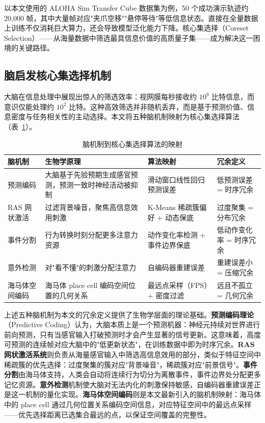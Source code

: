 \documentclass[12pt,a4paper]{article}
\begin{document}
以本文使用的 ALOHA Sim Transfer Cube 数据集为例，50 个成功演示轨迹约 20,000 帧，其中大量帧对应"夹爪空移""悬停等待"等低信息状态。直接在全量数据上训练不仅消耗巨大算力，还会导致模型泛化能力下降。核心集选择（Coreset Selection）——从海量数据中筛选最具信息价值的高质量子集——成为解决这一困境的关键路径\cite{sorscher2022beyond}。

\subsection{脑启发核心集选择机制}

大脑在信息处理中展现出惊人的筛选效率：视网膜每秒接收约 $10^9$ 比特信息，而意识仅能处理约 $10^2$ 比特。这种高效筛选并非随机丢弃，而是基于预测价值、信息密度与任务相关性的主动选择。本文将五种脑机制映射为核心集选择算法（表~\ref{tab:brain_mapping}）。

\begin{table}[htbp]
\centering
\caption{脑机制到核心集选择算法的映射}
\label{tab:brain_mapping}
\small
\begin{tabular}{@{}lp{5.5cm}p{4.0cm}p{2.8cm}@{}}
\toprule
\textbf{脑机制} & \textbf{生物学原理} & \textbf{算法映射} & \textbf{冗余定义} \\
\midrule
预测编码 & 大脑基于先验预期生成感官预测，预测一致时神经活动被抑制 & 滑动窗口线性回归预测误差 & 低预测误差 = 时序冗余 \\
RAS 网状激活 & 过滤背景噪音，聚焦高信息效用刺激 & K-Means 稀疏簇偏好 + 动态保底 & 过度聚集 = 分布冗余 \\
事件分割 & 行为转换时刻分配更多注意力资源 & 动作变化率检测 + 事件边界保底 & 低动作变化率 = 时序冗余 \\
意外检测 & 对"看不懂"的刺激分配注意力 & 自编码器重建误差 & 重建误差小 = 压缩冗余 \\
海马体空间编码 & 海马体 place cell 编码空间位置的几何关系 & 最远点采样（FPS）+ 密度过滤 & 远且不孤立 = 几何冗余 \\
\bottomrule
\end{tabular}
\end{table}

上述五种脑机制为本文的冗余定义提供了生物学层面的理论基础。\textbf{预测编码理论}（Predictive Coding）认为，大脑本质上是一个预测机器：神经元持续对世界进行前向预测，只有当感官输入打破预测时才会产生显著的信号更新\cite{millidge2021predictive}。这意味着，高度可预测的连续帧对应大脑中的"低更新状态"，在训练数据中即为时序冗余。\textbf{RAS 网状激活系统}则负责从海量感官输入中筛选高信息效用的部分，类似于特征空间中稀疏簇的优先选择：过度聚集的簇对应"背景噪音"，稀疏簇对应"前景信号"。\textbf{事件分割}由海马体支持，人类会自动将连续行为切分为离散事件，事件边界处分配更多记忆资源。\textbf{意外检测}机制使大脑对无法内化的刺激保持敏感，自编码器重建误差正是这一机制的量化实现。\textbf{海马体空间编码}则是本文最新引入的脑机制映射：海马体中的 place cell 通过几何位置关系编码空间信息，对应特征空间中的最远点采样——优先选择距离已选集合最远的点，以保证空间覆盖的完整性。
\end{document}
